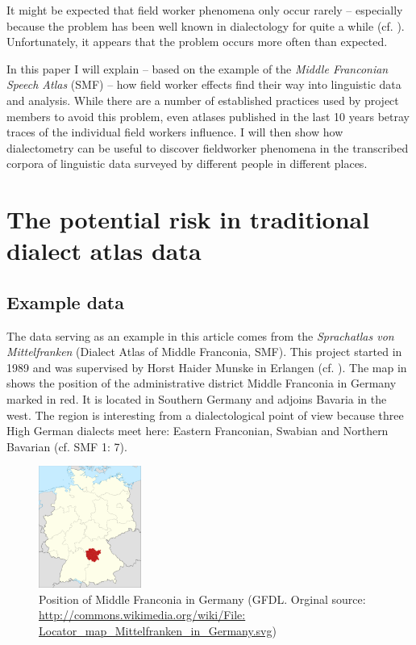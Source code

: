 \documentclass[output=paper]{LSP/langsci}
\begin{document}
It might be expected that field worker phenomena only occur rarely – especially because the problem has been well known in dialectology for quite a while (cf. \citealt[59--73]{hotzenkocherle_einfuhrung_1962}). Unfortunately, it appears that the problem occurs more often than expected.

In this paper I will explain – based on the example of the \textit{Middle Franconian Speech Atlas} (SMF) – how field worker effects find their way into linguistic data and analysis. While there are a number of established practices used by project members to avoid this problem, even atlases published in the last 10 years betray traces of the individual field workers{\textquotesingle} influence. I will then show how dialectometry can be useful to discover fieldworker phenomena in the transcribed corpora of linguistic data surveyed by different people in different places.

\section{The potential risk in traditional dialect atlas data}

\subsection{Example data}
The data serving as an example in this article comes from the \textit{Sprachatlas von Mittelfranken} (Dialect Atlas of Middle Franconia, SMF). This project started in 1989 and was supervised by Horst Haider Munske in Erlangen (cf. \citealt[11]{munske_zur_2013}). The map in  shows the position of the administrative district Middle Franconia in Germany marked in red. It is located in Southern Germany and adjoins Bavaria in the west. The region is interesting from a dialectological point of view because three High German dialects meet here: Eastern Franconian, Swabian and Northern Bavarian (cf. SMF 1: 7).

\begin{figure}
\includegraphics[width=0.3\textwidth]{illustrations/mathus_fig2}
\caption{Position of Middle Franconia in Germany (GFDL. Orginal source: \url{http://commons.wikimedia.org/wiki/File: Locator\_map\_Mittelfranken\_in\_Germany.svg})}
\label{fig:2}
\end{figure}
\end{document}
